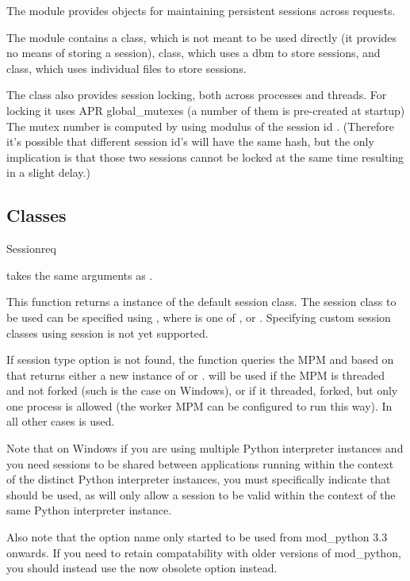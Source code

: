 The  module provides objects for maintaining persistent
sessions across requests.

The module contains a  class, which is not meant to
be used directly (it provides no means of storing a session), 
 class, which uses a dbm to store sessions, and
 class, which uses individual files to store
sessions.

The  class also provides session locking, both
across processes and threads. For locking it uses APR global_mutexes
(a number of them is pre-created at startup) The mutex number is
computed by using modulus of the session id
. (Therefore it's possible that different session
id's will have the same hash, but the only implication is that those
two sessions cannot be locked at the same time resulting in a slight
delay.)

\subsection{Classes\label{pyapi-sess-classes}}

\begin{funcdesc}{Session}{req}

   takes the same arguments as .

  This function returns a instance of the default session class. The
  session class to be used can be specified using , where  is one of
  ,  or .
  Specifying custom session classes using  session is
  not yet supported.

  If session type option is not found, the function queries the MPM and
  based on that returns either a new instance of  or
  .  will be used if the MPM is
  threaded and not forked (such is the case on Windows), or if it threaded,
  forked, but only one process is allowed (the worker MPM can be configured
  to run this way). In all other cases  is used.

  Note that on Windows if you are using multiple Python interpreter
  instances and you need sessions to be shared between applications
  running within the context of the distinct Python interpreter
  instances, you must specifically indicate that 
  should be used, as  will only allow a session
  to be valid within the context of the same Python interpreter instance.

  Also note that the option name 
  only started to be used from mod_python 3.3 onwards. If you need to
  retain compatability with older versions of mod_python, you should
  instead use the now obsolete  option instead.
\end{funcdesc}

